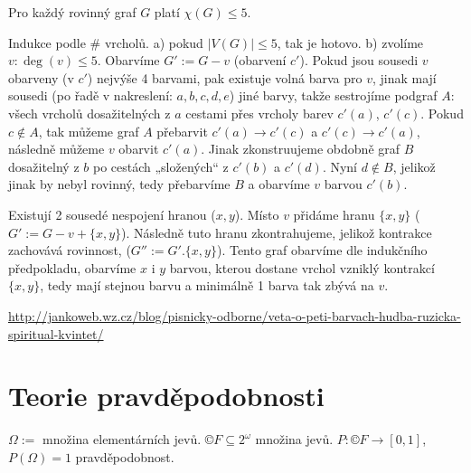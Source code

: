 \documentclass[12pt]{article}					%
\begin{document}
        \begin{veta}[O 5 barvách]
            Pro každý rovinný graf $G$ platí $\chi(G) ≤ 5$.
            \begin{dukazin}
                    Indukce podle \# vrcholů. a) pokud $|V(G)| ≤ 5$, tak je hotovo. b) zvolíme $v: \deg(v) ≤ 5$. Obarvíme $G' := G-v$ (obarvení $c'$). Pokud jsou sousedi $v$ obarveny (v $c'$) nejvýše 4 barvami, pak existuje volná barva pro $v$, jinak mají sousedi (po řadě v nakreslení: $a, b, c, d, e$) jiné barvy, takže sestrojíme podgraf $A:$ všech vrcholů dosažitelných z $a$ cestami přes vrcholy barev $c'(a)$, $c'(c)$. Pokud $c \notin A$, tak můžeme graf $A$ přebarvit $c'(a) \rightarrow c'(c)$ a $c'(c) \rightarrow c'(a)$, následně můžeme $v$ obarvit $c'(a)$. Jinak zkonstruujeme obdobně graf $B$ dosažitelný z $b$ po cestách „složených“ z $c'(b)$ a $c'(d)$. Nyní $d \notin B$, jelikož jinak by nebyl rovinný, tedy přebarvíme $B$ a obarvíme $v$ barvou $c'(b)$.
            \end{dukazin}
            
            \begin{dukazin}[Podobná indukce, jinak vyřešíme $\deg(v) = 5$]
                Existují 2 sousedé nespojení hranou ($x, y$). Místo $v$ přidáme hranu $\{x, y\}$ ($G':=G-v+\{x, y\}$). Následně tuto hranu zkontrahujeme, jelikož kontrakce zachovává rovinnost, ($G'':=G'.\{x, y\}$). Tento graf obarvíme dle indukčního předpokladu, obarvíme $x$ i $y$ barvou, kterou dostane vrchol vzniklý kontrakcí $\{x, y\}$, tedy mají stejnou barvu a minimálně 1 barva tak zbývá na $v$.
            \end{dukazin}

            \begin{dukazin}
                \href{http://jankoweb.wz.cz/blog/pisnicky-odborne/veta-o-peti-barvach-hudba-ruzicka-spiritual-kvintet/}{http://jankoweb.wz.cz/blog/pisnicky-odborne/veta-o-peti-barvach-hudba-ruzicka-spiritual-kvintet/}
            \end{dukazin}
        \end{veta}

\section{Teorie pravděpodobnosti}
    \begin{definice}
            $\Omega :=$ množina elementárních jevů. $©F \subseteq 2^{\omega}$ množina jevů. $P: ©F \rightarrow [0, 1]$, $P(\Omega) = 1$ pravděpodobnost.
    \end{definice}
\end{document}
